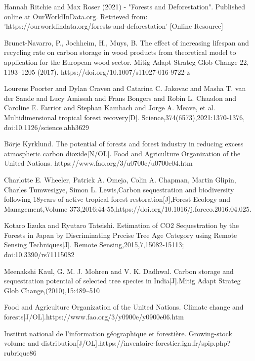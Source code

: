 \begin{thebibliography}{99}
  
 Hannah Ritchie and Max Roser (2021) - "Forests and Deforestation". Published online at OurWorldInData.org. Retrieved from: 'https://ourworldindata.org/forests-and-deforestation' [Online Resource]
  
 Brunet-Navarro, P., Jochheim, H., Muys, B. The effect of increasing lifespan and recycling rate on carbon storage in wood products from theoretical model to application for the European wood sector. Mitig Adapt Strateg Glob Change 22, 1193–1205 (2017). https://doi.org/10.1007/s11027-016-9722-z
   
 Lourens Poorter  and Dylan Craven  and Catarina C. Jakovac  and Masha T. van der Sande  and Lucy Amissah  and Frans Bongers  and Robin L. Chazdon  and Caroline E. Farrior  and Stephan Kambach  and Jorge A. Meave, et al. Multidimensional tropical forest recovery[D]. Science,374(6573),2021:1370-1376, doi:10.1126/science.abh3629
  
 Börje Kyrklund. The potential of forests and forest industry in reducing excess atmospheric carbon dioxide[N/OL]. Food and Agriculture Organization of the United Nations. https://www.fao.org/3/u0700e/u0700e04.htm
  
 Charlotte E. Wheeler, Patrick A. Omeja, Colin A. Chapman, Martin Glipin, Charles Tumwesigye, Simon L. Lewis,Carbon sequestration and biodiversity following 18years of active tropical forest restoration[J],Forest Ecology and Management,Volume 373,2016:44-55,https://doi.org/10.1016/j.foreco.2016.04.025.
  
 Kotaro Iizuka and Ryutaro Tateishi. Estimation of CO2 Sequestration by the Forests in Japan by Discriminating Precise Tree Age Category using Remote Sensing Techniques[J]. Remote Sensing,2015,7,15082-15113; doi:10.3390/rs71115082
  
 Meenakshi Kaul, G. M. J. Mohren and V. K. Dadhwal. Carbon storage and sequestration potential of selected tree species in India[J].Mitig Adapt Strateg Glob Change,(2010),15:489–510
 
 Food and Agriculture Organization of the United Nations. Climate change and forests[J/OL].https://www.fao.org/3/y0900e/y0900e06.htm
 
 Institut national de l’information géographique et forestière. Growing-stock volume and distribution[J/OL].https://inventaire-forestier.ign.fr/spip.php?rubrique86
  

\end{thebibliography}
